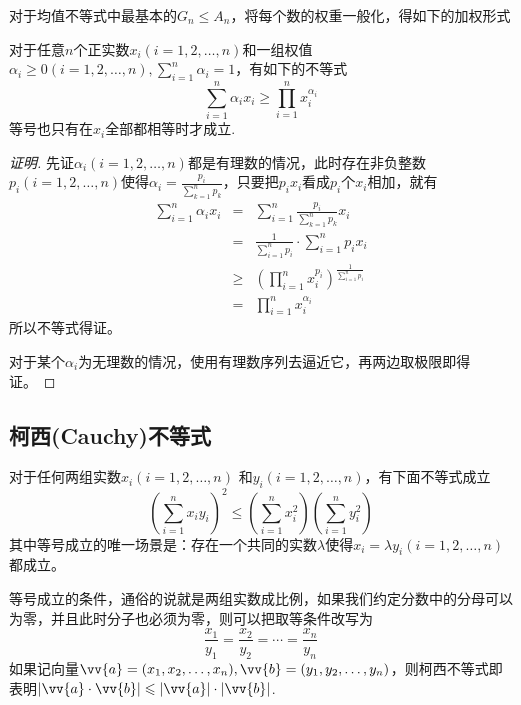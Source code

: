 对于均值不等式中最基本的$G_n\leqslant A_n$，将每个数的权重一般化，得如下的加权形式
\begin{theorem}[加权平均值不等式]
  对于任意$n$个正实数$x_{i}(i=1,2,\ldots,n)$和一组权值$\alpha_i\geqslant 0(i=1,2,\ldots,n),\sum_{i=1}^n\alpha_i=1$，有如下的不等式
  \begin{equation}
    \label{eq:mean-inequation-with-weight}
    \sum_{i=1}^n\alpha_ix_i \geqslant \prod_{i=1}^nx_i^{\alpha_i}
  \end{equation}
  等号也只有在$x_i$全部都相等时才成立.
\end{theorem}
\begin{proof}[证明]
  先证$\alpha_i(i=1,2,\ldots,n)$都是有理数的情况，此时存在非负整数$p_i(i=1,2,\ldots,n)$使得$\alpha_i=\frac{p_i}{\sum_{k=1}^np_k}$，只要把$p_ix_i$看成$p_i$个$x_i$相加，就有
  \begin{eqnarray*}
    \sum_{i=1}^n\alpha_ix_i &=& \sum_{i=1}^n \frac{p_i}{\sum_{k=1}^np_k}x_i \\
                            &=& \frac{1}{\sum_{i=1}^np_i} \cdot \sum_{i=1}^np_ix_i \\
                            & \geqslant & \left (\prod_{i=1}^nx_i^{p_i} \right)^{\frac{1}{\sum_{i=1}^n p_i}} \\
    & = & \prod_{i=1}^n x_i^{\alpha_i}
  \end{eqnarray*}
  所以不等式得证。

  对于某个$\alpha_i$为无理数的情况，使用有理数序列去逼近它，再两边取极限即得证。
\end{proof}

\subsection{柯西(Cauchy)不等式}

\begin{theorem}[柯西不等式]
  对于任何两组实数$x_i(i=1,2,\ldots,n)$ 和$y_i(i=1,2,\ldots,n)$，有下面不等式成立
  \begin{equation}
    \label{eq:cauchy-inequation}
    \left( \sum_{i=1}^nx_iy_i \right)^{2} \leqslant \left( \sum_{i=1}^{n}x_i^2 \right) \left( \sum_{i=1}^ny_i^{2} \right)
  \end{equation}
  其中等号成立的唯一场景是：存在一个共同的实数$\lambda$使得$x_i=\lambda y_{i}(i=1,2,\ldots,n)$都成立。
\end{theorem}
等号成立的条件，通俗的说就是两组实数成比例，如果我们约定分数中的分母可以为零，并且此时分子也必须为零，则可以把取等条件改写为
\begin{equation*}
  \frac{x_1}{y_1} = \frac{x_2}{y_2} = \cdots = \frac{x_n}{y_n}
\end{equation*}
如果记向量$\vv{a}=(x_1,x_2,\ldots,x_n), \vv{b}=(y_1,y_2,\ldots,y_n)$，则柯西不等式即表明$|\vv{a} \cdot \vv{b}| \leqslant |\vv{a}| \cdot |\vv{b}|$.

